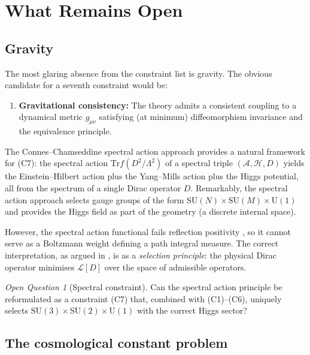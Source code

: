 \documentclass[12pt]{article}
\theoremstyle{definition}
\theoremstyle{remark}
\newtheorem{openq}[theorem]{Open Question}
\newcommand{\SU}{\mathrm{SU}}
\newcommand{\UU}{\mathrm{U}}
\newcommand{\Tr}{\mathrm{Tr}}
\begin{document}
\section{What Remains Open}
\label{sec:open}

\subsection{Gravity}

The most glaring absence from the constraint list is gravity.
The obvious candidate for a seventh constraint would be:

\begin{enumerate}[label=\textbf{(C\arabic*)}, start=7]
\item \textbf{Gravitational consistency:}
  The theory admits a consistent coupling to a dynamical
  metric $g_{\mu\nu}$ satisfying (at minimum) diffeomorphism
  invariance and the equivalence principle.
\end{enumerate}

The Connes--Chamseddine spectral action approach
\cite{CCM2007,CC1996} provides a natural framework for (C7):
the spectral action $\Tr f(D^2/\Lambda^2)$ of a spectral triple
$(\mathcal{A}, \mathcal{H}, D)$ yields the Einstein--Hilbert
action plus the Yang--Mills action plus the Higgs potential,
all from the spectrum of a single Dirac operator $D$.
Remarkably, the spectral action approach selects gauge groups
of the form $\SU(N) \times \SU(M) \times \UU(1)$ and
provides the Higgs field as part of the geometry (a discrete
internal space).

However, the spectral action functional fails reflection
positivity \cite{Olbryk2026v5}, so it cannot serve as a
Boltzmann weight defining a path integral measure.  The
correct interpretation, as argued in \cite{Olbryk2026v5},
is as a \emph{selection principle}: the physical Dirac operator
minimises $\mathcal{L}[D]$ over the space of admissible operators.

\begin{openq}[Spectral constraint]
Can the spectral action principle be reformulated as a constraint
(C7) that, combined with (C1)--(C6), uniquely selects
$\SU(3) \times \SU(2) \times \UU(1)$ with the correct Higgs
sector?
\end{openq}

\subsection{The cosmological constant problem}
\end{document}
